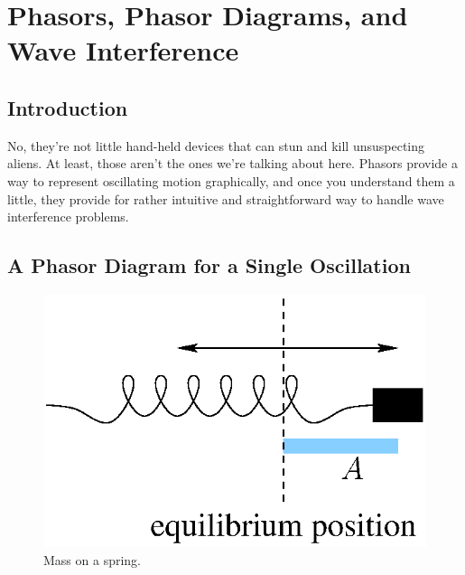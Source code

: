 
\chapter[Phasor Diagrams]{Phasors, Phasor Diagrams, and Wave Interference}
\label{chapter:phasors}

\section{Introduction}
\label{sec:phasors_intro}

No, they're not little hand-held devices that can stun and kill
unsuspecting aliens. At least, those aren't the ones we're talking
about here. Phasors provide a way to represent oscillating motion
graphically, and once you understand them a little, they provide for
rather intuitive and straightforward way to handle wave interference
problems.

\section{A Phasor Diagram for a Single Oscillation}
\label{sec:phasor_single}

\begin{figure}\begin{center}
 \includegraphics[width=2.0truein]{phasors/phasor01} 
\caption{\label{fig:phasor01} Mass on a spring.}
\end{center}
\end{figure}


